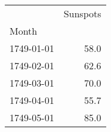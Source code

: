 \begin{tabular}{lr}
\toprule
{} &  Sunspots \\
Month      &           \\
\midrule
1749-01-01 &      58.0 \\
1749-02-01 &      62.6 \\
1749-03-01 &      70.0 \\
1749-04-01 &      55.7 \\
1749-05-01 &      85.0 \\
\bottomrule
\end{tabular}

